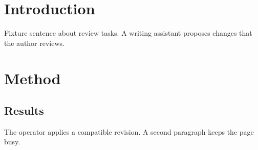 \documentclass{article}
\begin{document}
\section{Introduction}
Fixture sentence about review tasks. A writing assistant proposes changes that the author reviews.

\clearpage
\section{Method}
\subsection{Results}
The operator applies a compatible revision. A second paragraph keeps the page busy.
\end{document}
